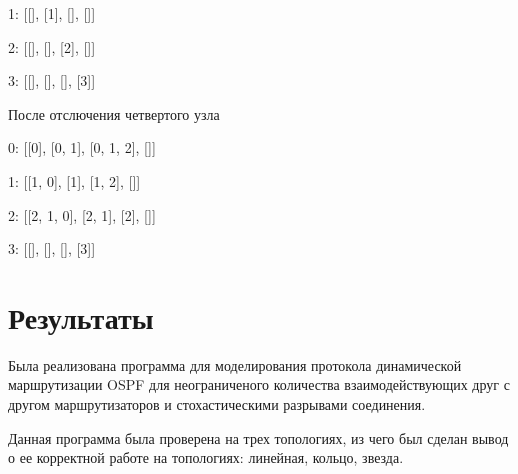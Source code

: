 \documentclass[a4paper,12pt]{article}
\begin{document}
1: [[], [1], [], []]

2: [[], [], [2], []]

3: [[], [], [], [3]]

После отслючения четвертого узла

0: [[0], [0, 1], [0, 1, 2], []]

1: [[1, 0], [1], [1, 2], []]

2: [[2, 1, 0], [2, 1], [2], []]

3: [[], [], [], [3]]

\section{Результаты}

Была реализована программа для моделирования протокола динамической 
маршрутизации OSPF для неограниченого количества взаимодействующих друг с 
другом маршрутизаторов и стохастическими разрывами соединения.

Данная программа была проверена на трех топологиях, из чего был сделан вывод 
о ее корректной работе на топологиях: линейная, кольцо, звезда.
\end{document}
